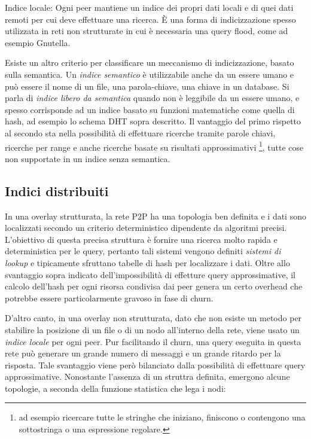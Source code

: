 Indice locale: Ogni peer mantiene un indice dei propri dati locali e di quei dati remoti per cui deve effettuare una ricerca. È una forma di indicizzazione spesso utilizzata in reti non strutturate in cui è necessaria una query flood, come ad esempio Gnutella.

Esiste un altro criterio per classificare un meccanismo di indicizzazione, basato sulla semantica. Un \emph{indice semantico} è utilizzabile anche da un essere umano e può essere il nome di un file, una parola-chiave, una chiave in un database. Si parla di \emph{indice libero da semantica} quando non è leggibile da un essere umano, e spesso corrisponde ad un indice basato su funzioni matematiche come quella di hash, ad esempio lo schema DHT sopra descritto. Il vantaggio del primo rispetto al secondo sta nella possibilità di effettuare ricerche tramite parole chiavi, ricerche per range e anche ricerche basate su risultati approssimativi \footnote{ad esempio ricercare tutte le stringhe che   iniziano, finiscono o contengono una sottostringa o una espressione   regolare.}, tutte cose non supportate in un indice senza semantica.

\subsection{Indici distribuiti}\label{indici-distribuiti-todo-probabilmente-posso-eliminare}

In una overlay strutturata, la rete P2P ha una topologia ben definita e i dati sono localizzati secondo un criterio deterministico dipendente da algoritmi precisi. L'obiettivo di questa precisa struttura è fornire una ricerca molto rapida e deterministica per le query, pertanto tali sistemi vengono definiti \emph{sistemi di lookup} e tipicamente sfruttano tabelle di hash per localizzare i dati. Oltre allo svantaggio sopra indicato dell'impossibilità di effetture query approssimative, il calcolo dell'hash per ogni risorsa condivisa dai peer genera un certo overhead che potrebbe essere particolarmente gravoso in fase di \gls{churn}.

D'altro canto, in una overlay non strutturata, dato che non esiste un metodo per stabilire la posizione di un file o di un nodo all'interno della rete, viene usato un \emph{indice locale} per ogni peer. Pur facilitando il \gls{churn}, una query eseguita in questa rete può generare un grande numero di messaggi e un grande ritardo per la risposta. Tale svantaggio viene però bilanciato dalla possibilità di effettuare query approssimative. Nonostante l'assenza di un struttra definita, emergono alcune topologie, a seconda della funzione statistica che lega i nodi:

